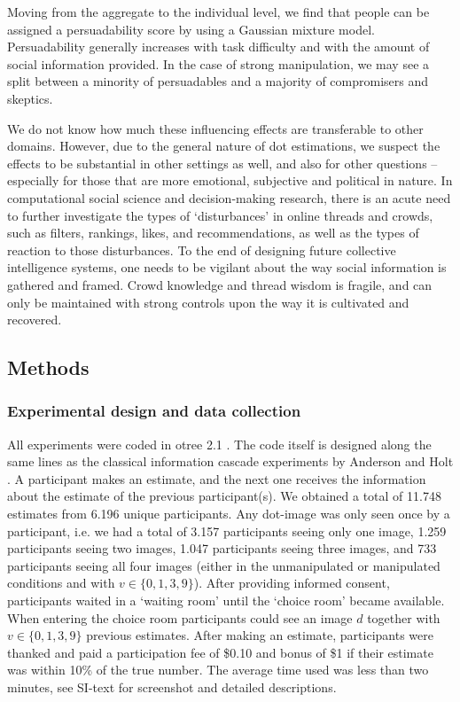 \documentclass[9pt,a4paper,twocolumn,lineno]{article}
\begin{document}
Moving from the aggregate to the individual level, we find that people can be assigned a persuadability score by using a Gaussian mixture model. Persuadability generally increases with task difficulty and with the amount of social information provided. In the case of strong manipulation, we may see a split between a minority of persuadables and a majority of compromisers and skeptics. 

We do not know how much these influencing effects are transferable to other domains. However, due to the general nature of dot estimations, we suspect the effects to be substantial in other settings as well, and also for other questions – especially for those that are more emotional, subjective and political in nature. In computational social science and decision-making research,  there is an acute need to further investigate the types of ‘disturbances’ in online threads and crowds, such as filters, rankings, likes, and recommendations, as well as the types of reaction to those disturbances. To the end of designing future collective intelligence systems, one needs to be vigilant about the way social information is gathered and framed. Crowd knowledge and thread wisdom is fragile, and can only be maintained with strong controls upon the way it is cultivated and recovered.

\subsection*{Methods}\scriptsize
\subsubsection*{Experimental design and data collection} 
All experiments were coded in otree 2.1 \cite{chen2016otree}. The code itself is designed along the same lines as the classical information cascade experiments by Anderson and Holt \cite{anderson1997information}. A participant makes an estimate, and the next one receives the information about the estimate of the previous participant(s). %
We obtained a total of 11.748 estimates from 6.196 unique participants. Any dot-image was only seen once by a participant, i.e. we had a total of 3.157 participants seeing only one image, 1.259 participants seeing two images, 1.047 participants seeing three images, and 733 participants seeing all four images (either in the unmanipulated or manipulated conditions and with $v \in \{0, 1, 3, 9\}$). After providing informed consent, participants waited in a ‘waiting room’ until the ‘choice room’ became available. When entering the choice room participants could see an image $d$ together with $v \in \{0,1,3,9\}$ previous estimates. After making an estimate, participants were thanked and paid a participation fee of \$0.10 and bonus of \$1 if their estimate was within 10\% of the true number. The average time used was less than two minutes, see SI-text for screenshot and detailed descriptions.
\end{document}
